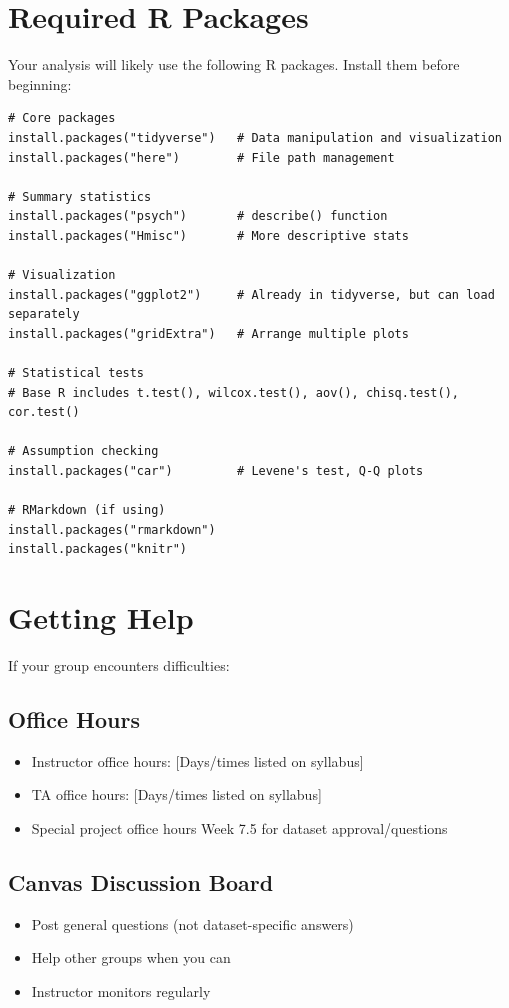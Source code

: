 \documentclass[11pt]{article}
\begin{document}
\newpage

\section*{Required R Packages}

Your analysis will likely use the following R packages. Install them before beginning:

\begin{lstlisting}
# Core packages
install.packages("tidyverse")   # Data manipulation and visualization
install.packages("here")        # File path management

# Summary statistics
install.packages("psych")       # describe() function
install.packages("Hmisc")       # More descriptive stats

# Visualization
install.packages("ggplot2")     # Already in tidyverse, but can load separately
install.packages("gridExtra")   # Arrange multiple plots

# Statistical tests
# Base R includes t.test(), wilcox.test(), aov(), chisq.test(), cor.test()

# Assumption checking
install.packages("car")         # Levene's test, Q-Q plots

# RMarkdown (if using)
install.packages("rmarkdown")
install.packages("knitr")
\end{lstlisting}

\section*{Getting Help}

If your group encounters difficulties:

\subsection*{Office Hours}
\begin{itemize}
\item Instructor office hours: [Days/times listed on syllabus]
\item TA office hours: [Days/times listed on syllabus]
\item Special project office hours Week 7.5 for dataset approval/questions
\end{itemize}

\subsection*{Canvas Discussion Board}
\begin{itemize}
\item Post general questions (not dataset-specific answers)
\item Help other groups when you can
\item Instructor monitors regularly
\end{itemize}
\end{document}
